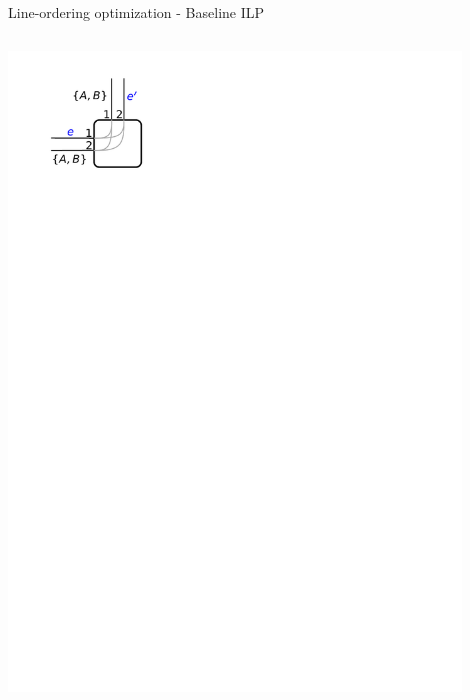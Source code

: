 \documentclass{beamer}
\begin{document}
\begin{frame}{Line-ordering optimization - Baseline ILP}
	\begin{columns}[T]
		\begin{column}{0.25\textwidth}
			\centering\includegraphics[width=0.9\textwidth, page=1]{figures/crossing.pdf}


\end{column}
\end{columns}
\end{frame}
\end{document}
